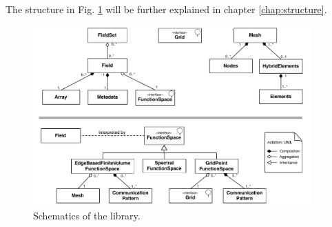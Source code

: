 The structure in Fig. \ref{fig:intro-schematics} will be 
further explained in chapter \ref{chap:structure}.
%
\begin{figure}[htb!]
  \centering
    \includegraphics[width=0.95\textwidth]{imgs/schematics.png}
    \caption{Schematics of the \Atlas library.}
    \label{fig:intro-schematics}
\end{figure}
%